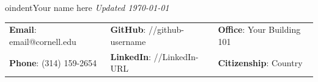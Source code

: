 \documentclass[letterpaper, 11pt]{article}
\begin{document}

oindent{\Huge{Your name here}
\hfill{\it\footnotesize Updated \today}}


\vspace{0.5cm} 
\begin{center}
\begin{tabular}{lll}
\textbf{Email}: email@cornell.edu      &
\hspace{0.55in} \textbf{GitHub}: //github-username    &
\hspace{0.4in} 	\textbf{Office}: Your Building 101 \\

\textbf{Phone}: (314) 159-2654   & 
\hspace{0.55in} \textbf{LinkedIn}: //LinkedIn-URL   & 
\hspace{0.4in} \textbf{Citizenship}: Country 
\end{tabular}
\end{center}


\setlength{\tabcolsep}{8pt}
\end{document}
